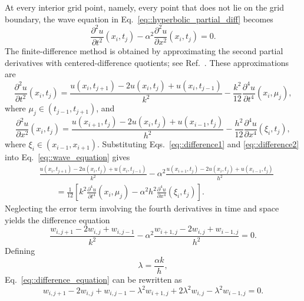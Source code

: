 \documentclass[a4paper]{article}
\begin{document}
At every interior grid point, namely, every point that does not lie on the grid boundary, the wave equation in Eq.~\ref{eq::hyperbolic_partial_diff} becomes
\begin{equation}\label{eq::wave_equation}
\frac{\partial^2 u}{\partial t^2}(x_i,t_j)-\alpha^2\frac{\partial^2 u}{\partial x^2}(x_i,t_j)=0.
\end{equation}
The finite-difference method is obtained by approximating the second partial derivatives with centered-difference quotients; see Ref.~\cite{Burden}. These approximations are
\begin{equation}\label{eq::difference1}
\frac{\partial^2 u}{\partial t^2}(x_i,t_j)=\frac{u(x_i,t_{j+1})-2u(x_i,t_j)+u(x_i,t_{j-1})}{k^2}-\frac{k^2}{12}\frac{\partial^4 u}{\partial t^4}(x_i,\mu_j),
\end{equation}
where $\mu_j\in(t_{j-1},t_{j+1})$, and
\begin{equation}\label{eq::difference2}
\frac{\partial^2 u}{\partial x^2}(x_i,t_j)=\frac{u(x_{i+1},t_j)-2u(x_i,t_j)+u(x_{i-1},t_j)}{h^2}-\frac{h^2}{12}\frac{\partial^4 u}{\partial x^4}(\xi_i,t_j),
\end{equation}
where $\xi_i\in(x_{i-1},x_{i+1})$. Substituting Eqs.~\ref{eq::difference1} and \ref{eq::difference2} into Eq.~\ref{eq::wave_equation} gives
\begin{equation}
\begin{aligned}
&\frac{u(x_i,t_{j+1})-2u(x_i,t_j)+u(x_i,t_{j-1})}{k^2}-\alpha^2\frac{u(x_{i+1},t_j)-2u(x_i,t_j)+u(x_{i-1},t_j)}{h^2}\\
&\qquad=\frac{1}{12}\left[k^2\frac{\partial^4u}{\partial t^4}(x_i,\mu_j)-\alpha^2h^2\frac{\partial^4u}{\partial x^4}(\xi_i,t_j)\right].
\end{aligned}
\end{equation}
Neglecting the error term involving the fourth derivatives in time and space yields the difference equation
\begin{equation}\label{eq::difference_equation}
\frac{w_{i,j+1}-2w_{i,j}+w_{i,j-1}}{k^2}-\alpha^2\frac{w_{i+1,j}-2w_{i,j}+w_{i-1,j}}{h^2}=0.
\end{equation}
Defining
\begin{equation}
\lambda=\frac{\alpha k}{h},
\end{equation}
Eq.~\ref{eq::difference_equation} can be rewritten as
\begin{equation}\label{eq::difference_equation_2}
w_{i,j+1}-2w_{i,j}+w_{i,j-1}-\lambda^2w_{i+1,j}+2\lambda^2w_{i,j}-\lambda^2w_{i-1,j}=0.
\end{equation}
\end{document}
